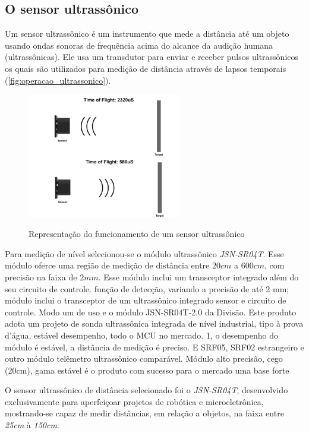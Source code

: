 \subsection{O sensor ultrassônico}
\label{ssec:sensor_ultra}

Um sensor ultrassônico é um instrumento que mede a distância até um objeto usando ondas sonoras de frequência acima do alcance da audição humana (ultrassônicas). Ele usa um transdutor para enviar e receber pulsos ultrassônicos os quais são utilizados para medição de distância através de lapsos temporais (\autoref{fig:operacao_ultrassonico}).

\begin{figure}[H]
	\centering
	\caption{Representação do funcionamento de um sensor ultrassônico}
	\includegraphics[width=0.6\textwidth]{figuras/ultrassonico_operacao.png}
	\label{fig:operacao_ultrassonico}
\end{figure}

Para medição de nível selecionou-se o módulo ultrassônico \textit{JSN-SR04T}. Esse módulo oferce uma região de medição de distância entre $20 cm$ a $600 cm$, com precisão na faixa de $2 mm$.
Esse módulo inclui um transceptor integrado além do seu circuito de controle.
função de detecção, variando a precisão de até 2 mm; módulo inclui o transceptor de um ultrassônico integrado
sensor e circuito de controle. Modo um de uso e o módulo JSN-SR04T-2.0 da Divisão.
Este produto adota um projeto de sonda ultrassônica integrada de nível industrial, tipo à prova d'água, estável
desempenho, todo o MCU no mercado. 1, o desempenho do módulo é estável, a distância de medição
é preciso. E SRF05, SRF02 estrangeiro e outro módulo telêmetro ultrassônico comparável. Módulo alto
precisão, cego (20cm), gama estável é o produto com sucesso para o mercado uma base forte


O sensor ultrassônico de distância selecionado foi o \textit{JSN-SR04T}, desenvolvido exclusivamente para aperfeiçoar projetos de robótica e microeletrônica, mostrando-se capaz de medir distâncias, em relação a objetos, na faixa entre \textit{25cm} à \textit{150cm}.

